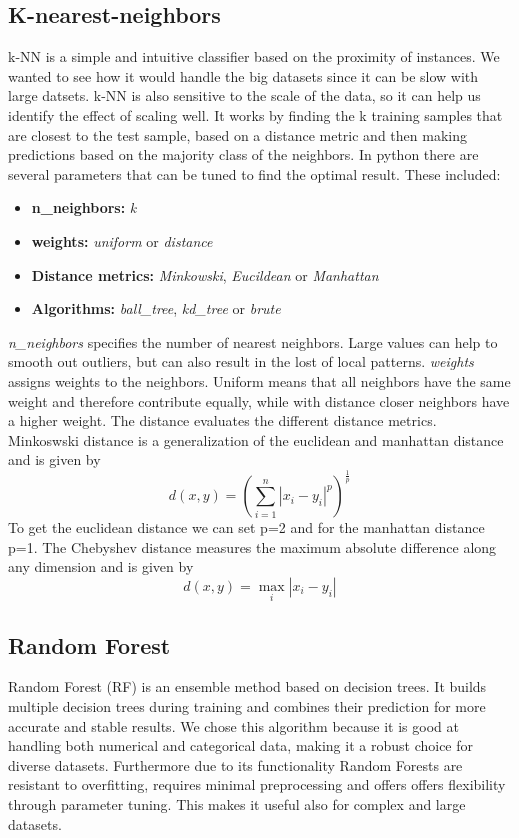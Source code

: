 \documentclass{article}
\begin{document}
\subsection{K-nearest-neighbors}
k-NN is a simple and intuitive classifier based on the proximity of instances. We wanted to see how it would handle the big datasets since it can be slow with large datsets. k-NN is also sensitive to the scale of the data, so it can help us identify the effect of scaling well. It works by finding the k training samples that are closest to the test sample, based on a distance metric and then making predictions based on the majority class of the neighbors.
In python there are several parameters that can be tuned to find the optimal result. These included:
\begin{itemize}
    \item \textbf{n\_neighbors:} \textit{k}
    \item \textbf{weights:} \textit{uniform} or \textit{distance}
    \item \textbf{Distance metrics:} \textit{Minkowski}, \textit{Eucildean} or \textit{Manhattan}
    \item \textbf{Algorithms:} \textit{ball\_tree}, \textit{kd\_tree} or \textit{brute}
\end{itemize}
\noindent \textit{n\_neighbors} specifies the number of nearest neighbors. Large values can help to smooth out outliers, but can also result in the lost of local patterns. 
\textit{weights} assigns weights to the neighbors. Uniform means that all neighbors have the same weight and therefore contribute equally, while with distance closer neighbors have a higher weight.
The distance evaluates the different distance metrics. Minkoswski distance is a generalization of the euclidean and manhattan distance and is given by 
\[
d(x, y) = \left( \sum_{i=1}^{n} |x_i - y_i|^p \right)^{\frac{1}{p}}
\]
To get the euclidean distance we can set p=2 and for the manhattan distance p=1.  The Chebyshev distance measures the maximum absolute difference along any dimension and is given by
\[
d(x, y) = \max_{i} |x_i - y_i|
\]


\subsection{Random Forest}
Random Forest (RF) is an ensemble  method based on decision trees. It builds multiple decision trees during training and combines their prediction for more accurate and stable results. We chose this algorithm because it is good at handling both numerical and categorical data, making it a robust choice for diverse datasets. Furthermore due to its functionality Random Forests are resistant to overfitting, requires minimal preprocessing and offers offers flexibility through parameter tuning. This makes it useful also for complex and large datasets.
\end{document}
